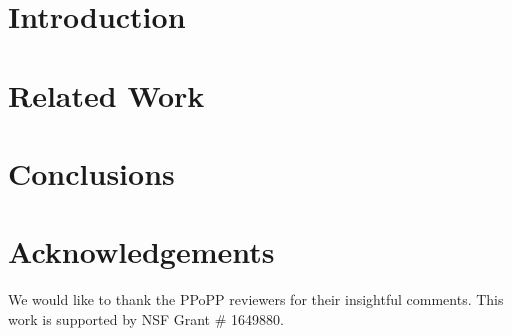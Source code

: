 \documentclass[sigplan,10pt]{acmart}\settopmatter{printfolios=true,printccs=false,printacmref=false}
\begin{document}

\maketitle

\section{Introduction}


\vspace{-10pt}
\section{Related Work}






\section{Conclusions}


\section{Acknowledgements}

We would like to thank the PPoPP reviewers for their insightful comments.
This work is supported by NSF Grant \# 1649880.

{\footnotesize 
}


%
\end{document}
